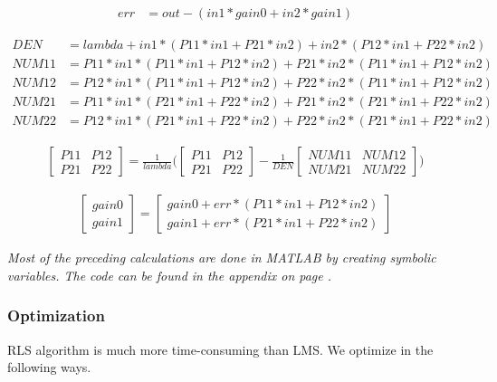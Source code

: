 \documentclass{article}
\begin{document}
\begin{align*}
err &= out - (in1 * gain0 + in2 * gain1)
\end{align*}

\begin{align*}
DEN &= lambda + in1*(P11*in1 + P21*in2) + in2*(P12*in1 + P22*in2)\\
NUM11 &= P11*in1*(P11*in1 + P12*in2) + P21*in2*(P11*in1 + P12*in2)\\
NUM12 &= P12*in1*(P11*in1 + P12*in2) + P22*in2*(P11*in1 + P12*in2)\\
NUM21 &= P11*in1*(P21*in1 + P22*in2) + P21*in2*(P21*in1 + P22*in2)\\
NUM22 &= P12*in1*(P21*in1 + P22*in2) + P22*in2*(P21*in1 + P22*in2)
\end{align*}

\begin{align*}
\begin{bmatrix}
P11 & P12\\
P21 & P22
\end{bmatrix}
= \frac{1}{lambda}
\Big(
\begin{bmatrix}
P11 & P12\\
P21 & P22
\end{bmatrix}
- \frac{1}{DEN}
\begin{bmatrix}
NUM11 & NUM12\\
NUM21 & NUM22
\end{bmatrix}
\Big)
\end{align*}

\begin{align*}
\begin{bmatrix}
gain0\\
gain1
\end{bmatrix}
=
\begin{bmatrix}
gain0 + err * (P11*in1 + P12*in2)\\
gain1 + err * (P21*in1 + P22*in2)
\end{bmatrix}
\end{align*}

\textit{Most of the preceding calculations are done in MATLAB by creating symbolic variables. The code can be found in the appendix on page \pageref{rls_syms}.}

\subsubsection*{Optimization}
RLS algorithm is much more time-consuming than LMS. We optimize in the following ways.\\
\end{document}
